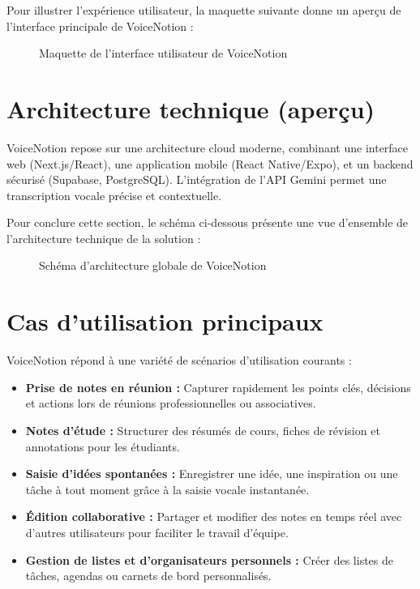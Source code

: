 Pour illustrer l’expérience utilisateur, la maquette suivante donne un aperçu de l’interface principale de VoiceNotion :

\begin{figure}[H]
    \centering
    \caption{Maquette de l’interface utilisateur de VoiceNotion}
    \label{fig:ui-mockup}
\end{figure}

\section{Architecture technique (aperçu)}
VoiceNotion repose sur une architecture cloud moderne, combinant une interface web (Next.js/React), une application mobile (React Native/Expo), et un backend sécurisé (Supabase, PostgreSQL). L’intégration de l’API Gemini permet une transcription vocale précise et contextuelle.

Pour conclure cette section, le schéma ci-dessous présente une vue d’ensemble de l’architecture technique de la solution :

\begin{figure}[H]
    \centering
    \caption{Schéma d’architecture globale de VoiceNotion}
    \label{fig:global-architecture}
\end{figure}

\section{Cas d’utilisation principaux}
VoiceNotion répond à une variété de scénarios d’utilisation courants :
\begin{itemize}
    \item \textbf{Prise de notes en réunion :} Capturer rapidement les points clés, décisions et actions lors de réunions professionnelles ou associatives.
    \item \textbf{Notes d’étude :} Structurer des résumés de cours, fiches de révision et annotations pour les étudiants.
    \item \textbf{Saisie d’idées spontanées :} Enregistrer une idée, une inspiration ou une tâche à tout moment grâce à la saisie vocale instantanée.
    \item \textbf{Édition collaborative :} Partager et modifier des notes en temps réel avec d’autres utilisateurs pour faciliter le travail d’équipe.
    \item \textbf{Gestion de listes et d’organisateurs personnels :} Créer des listes de tâches, agendas ou carnets de bord personnalisés.
\end{itemize}

